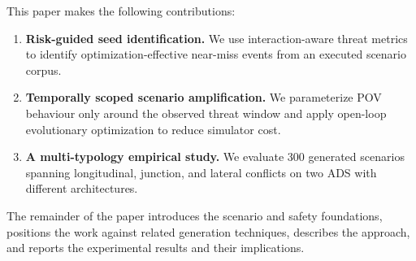This paper makes the following contributions:

\begin{enumerate}
  \item \textbf{Risk-guided seed identification.} We use interaction-aware threat metrics to identify optimization-effective near-miss events from an executed scenario corpus.
  \item \textbf{Temporally scoped scenario amplification.} We parameterize POV behaviour only around the observed threat window and apply open-loop evolutionary optimization to reduce simulator cost.
  \item \textbf{A multi-typology empirical study.} We evaluate 300 generated scenarios spanning longitudinal, junction, and lateral conflicts on two ADS with different architectures.
\end{enumerate}

The remainder of the paper introduces the scenario and safety foundations, positions the work against related generation techniques, describes the approach, and reports the experimental results and their implications.
